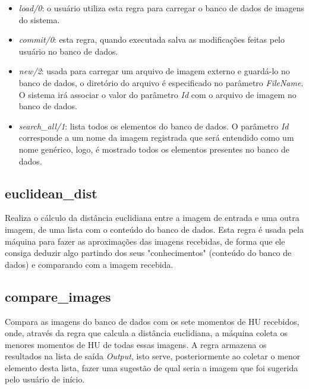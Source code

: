\documentclass{article}
\begin{document}
        \begin{itemize}
            \item \textit{load/0}: o usuário utiliza esta regra para carregar o banco de dados de imagens do sistema.
            
            \item \textit{commit/0}: esta regra, quando executada salva as modificações feitas pelo usuário no banco de dados.
            
            \item \textit{new/2}: usada para carregar um arquivo de imagem externo e guardá-lo no banco de dados, o diretório do arquivo é especificado no parâmetro \textit{FileName}. O sistema irá associar o valor do parâmetro \textit{Id} com o arquivo de imagem no banco de dados.
            
            \item \textit{search\_all/1}: lista todos os elementos do banco de dados. O parâmetro \textit{Id} corresponde a um nome da imagem registrada que será entendido como um nome genérico, logo, é mostrado todos os elementos presentes no banco de dados.
        \end{itemize}
        
    \newpage
    \subsection*{euclidean\_dist}
        Realiza o cálculo da distância euclidiana entre a imagem de entrada e uma outra imagem, de uma lista com o conteúdo do banco de dados. Esta regra é usada pela máquina para fazer as aproximações das imagens recebidas, de forma que ele consiga deduzir algo partindo dos seus "conhecimentos" (conteúdo do banco de dados) e comparando com a imagem recebida.
    
    \subsection*{compare\_images}
        Compara as imagens do banco de dados com os sete momentos de HU recebidos, onde, através da regra que calcula a distância euclidiana, a máquina coleta os menores momentos de HU de todas essas imagens. A regra armazena os resultados na lista de saída \textit{Output}, isto serve, posteriormente ao coletar o menor elemento desta lista, fazer uma sugestão de qual seria a imagem que foi sugerida pelo usuário de início.
    
\end{document}
